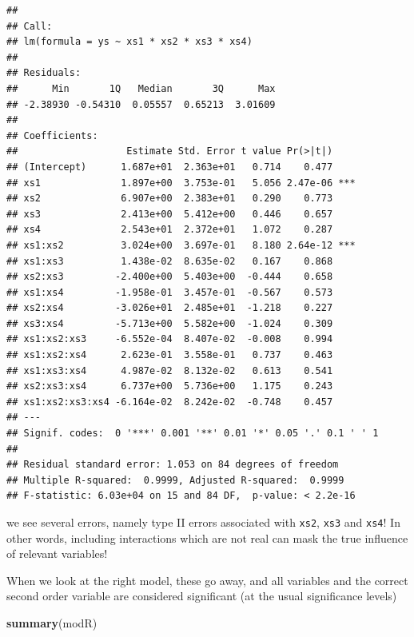 \documentclass[
]{book}
\newenvironment{Shaded}{\begin{snugshade}}{\end{snugshade}}
\newcommand{\KeywordTok}[1]{\textcolor[rgb]{0.13,0.29,0.53}{\textbf{#1}}}
\newcommand{\NormalTok}[1]{#1}
\begin{document}
\begin{verbatim}
## 
## Call:
## lm(formula = ys ~ xs1 * xs2 * xs3 * xs4)
## 
## Residuals:
##      Min       1Q   Median       3Q      Max 
## -2.38930 -0.54310  0.05557  0.65213  3.01609 
## 
## Coefficients:
##                   Estimate Std. Error t value Pr(>|t|)    
## (Intercept)      1.687e+01  2.363e+01   0.714    0.477    
## xs1              1.897e+00  3.753e-01   5.056 2.47e-06 ***
## xs2              6.907e+00  2.383e+01   0.290    0.773    
## xs3              2.413e+00  5.412e+00   0.446    0.657    
## xs4              2.543e+01  2.372e+01   1.072    0.287    
## xs1:xs2          3.024e+00  3.697e-01   8.180 2.64e-12 ***
## xs1:xs3          1.438e-02  8.635e-02   0.167    0.868    
## xs2:xs3         -2.400e+00  5.403e+00  -0.444    0.658    
## xs1:xs4         -1.958e-01  3.457e-01  -0.567    0.573    
## xs2:xs4         -3.026e+01  2.485e+01  -1.218    0.227    
## xs3:xs4         -5.713e+00  5.582e+00  -1.024    0.309    
## xs1:xs2:xs3     -6.552e-04  8.407e-02  -0.008    0.994    
## xs1:xs2:xs4      2.623e-01  3.558e-01   0.737    0.463    
## xs1:xs3:xs4      4.987e-02  8.132e-02   0.613    0.541    
## xs2:xs3:xs4      6.737e+00  5.736e+00   1.175    0.243    
## xs1:xs2:xs3:xs4 -6.164e-02  8.242e-02  -0.748    0.457    
## ---
## Signif. codes:  0 '***' 0.001 '**' 0.01 '*' 0.05 '.' 0.1 ' ' 1
## 
## Residual standard error: 1.053 on 84 degrees of freedom
## Multiple R-squared:  0.9999,	Adjusted R-squared:  0.9999 
## F-statistic: 6.03e+04 on 15 and 84 DF,  p-value: < 2.2e-16
\end{verbatim}

we see several errors, namely type II errors associated with \texttt{xs2}, \texttt{xs3} and \texttt{xs4}! In other words, including interactions which are not real can mask the true influence of relevant variables!

When we look at the right model, these go away, and all variables and the correct second order variable are considered significant (at the usual significance levels)

\begin{Shaded}
\begin{Highlighting}[]
\KeywordTok{summary}\NormalTok{(modR)}
\end{Highlighting}
\end{Shaded}
\end{document}

